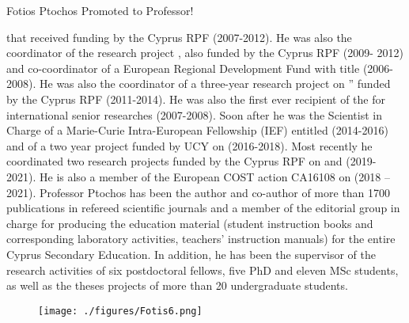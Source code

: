 \begin{headline}[enhanced, tikz={rotate=0}]{Fotios Ptochos Promoted to Professor!}
\begin{multicols}{2}
 that
received funding by the Cyprus RPF (2007-2012). He was also the
coordinator of the research project , also funded by the Cyprus RPF (2009- 2012) and
co-coordinator of a European Regional Development Fund with title  (2006-2008). He was also the coordinator of a three-year
research project on ”
funded by the Cyprus RPF (2011-2014). He was also the first
ever recipient of the 
for international senior researches (2007-2008). Soon after he was
the Scientist in Charge of a Marie-Curie Intra-European Fellowship
(IEF) entitled 
(2014-2016) and of a two year project funded by UCY on  (2016-2018). Most recently he coordinated
 two research projects funded by the Cyprus RPF on  and  (2019-2021). He
is also a member of the European COST action CA16108 on  (2018 – 2021). 
Professor Ptochos has been the author and co-author of more than 
1700 publications in refereed scientific journals and a member of the
editorial group in charge for producing the education material
(student instruction books and corresponding laboratory activities,
teachers’ instruction manuals) for the entire Cyprus Secondary
Education. In addition, he has been the supervisor of the research
activities of six postdoctoral fellows, five PhD and eleven MSc
students, as well as the theses projects of more than 20 undergraduate students.

    \begin{figure}
      \begin{center}
        \vspace{-0.2in}
        \leavevmode
        \texttt{[image: ./figures/Fotis6.png]}
      \end{center}
    \end{figure}
  \end{multicols}
\end{headline}
